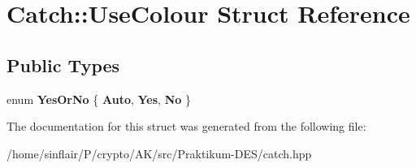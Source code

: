 \hypertarget{structCatch_1_1UseColour}{}\section{Catch\+:\+:Use\+Colour Struct Reference}
\label{structCatch_1_1UseColour}
\subsection*{Public Types}
\begin{DoxyCompactItemize}
\item 
\mbox{\label{structCatch_1_1UseColour_a6aa78da0c2de7539bb9e3757e204a3f1}} 
enum {\bfseries Yes\+Or\+No} \{ {\bfseries Auto}, 
{\bfseries Yes}, 
{\bfseries No}
 \}
\end{DoxyCompactItemize}


The documentation for this struct was generated from the following file\+:\begin{DoxyCompactItemize}
\item 
/home/sinflair/\+P/crypto/\+A\+K/src/\+Praktikum-\/\+D\+E\+S/catch.\+hpp\end{DoxyCompactItemize}
